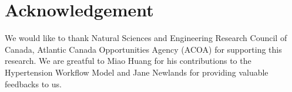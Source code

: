 \documentclass[a4paper]{llncs}
\begin{document}
\section*{Acknowledgement}\label{label:conclusion}
We would like to thank Natural Sciences and Engineering Research Council of Canada, Atlantic Canada Opportunities Agency (ACOA) for supporting this research. 
We are greatful to Miao Huang for his contributions to the Hypertension Workflow Model and Jane Newlands for providing valuable feedbacks to us. 

{}
\end{document}
